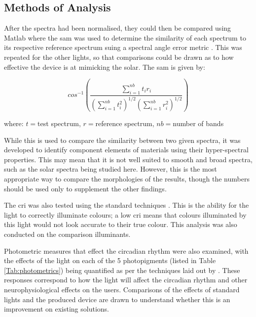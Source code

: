 \subsection{Methods of Analysis}

After the spectra had been normalised, they could then be compared using Matlab where the \acrfull{sam} was used to determine the similarity of each spectrum to its respective reference spectrum suing a spectral angle error metric \citep{kruseSpectralImageProcessing1993}. This was repeated for the other lights, so that comparisons could be drawn as to how effective the device is at mimicking the \gls{solar}. The \acrshort{sam} is given by:

\begin{equation}
cos^{-1}\left(\frac{\sum\limits_{i=1}^{nb} t_i r_i}{\left(\sum\limits_{i=1}^{nb} t_i^2\right)^{1/2}\left(\sum\limits_{i=1}^{nb} r_i^2\right)^{1/2}}\right)
\end{equation}

\begin{center}
where: $t=$test spectrum, $r=$reference spectrum, $nb=$number of bands
\end{center}

While this is used to compare the similarity between two given spectra, it was developed to identify component elements of materials using their hyper-spectral properties. This may mean that it is not well suited to smooth and broad spectra, such as the solar spectra being studied here. However, this is the most appropriate way to compare the morphologies of the results, though the numbers should be used only to supplement the other findings.

The \acrfull{cri} was also tested using the standard techniques \citep{liCRICAM02UCSColourRendering2012}. This is the ability for the light to correctly illuminate colours; a low \acrshort{cri} means that colours illuminated by this light would not look accurate to their true colour. This analysis was also conducted on the comparison illuminants.


Photometric measures that effect the circadian rhythm were also examined, with the effects of the light on each of the 5 photopigments (listed in Table \ref{Tab:photometrics}) being quantified as per the techniques laid out by \citet{lucasMeasuringUsingLight2014}. These responses correspond to how the light will affect the circadian rhythm and other neurophysiological effects on the users. Comparisons of the effects of standard lights and the produced device are drawn to understand whether this is an improvement on existing solutions.

